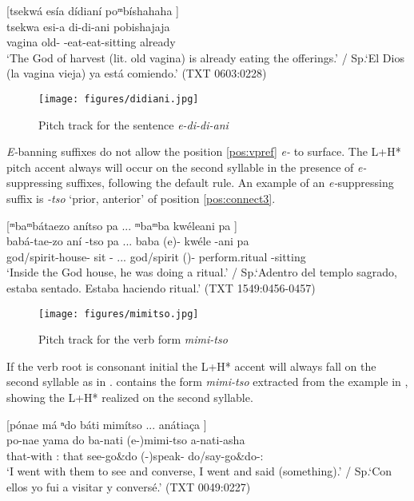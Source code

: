 \documentclass[output=paper,hidelinks]{langscibook}
\begin{document}
\ea \label{ex:didiani}
    [tsekwá esía dídianí poᵐbíshahaha \downarrow] \\
    \gll tsekwa esi-a di-di-ani pobishajaja  \\  
     vagina old-\Erg{} \E{}-eat-eat-sitting already   \\
    \glt `The God of harvest (lit. old vagina) is already eating the offerings.' / Sp.`El Dios (la vagina vieja) ya está comiendo.' \hfill (TXT 0603:0228)
\z 
\begin{figure}
    \texttt{[image: figures/didiani.jpg]}
    \caption{Pitch track for the sentence \textit{e-di-di-ani}}
    \label{fig:didiani}
\end{figure}

\textit{E-}banning suffixes do not allow the position \ref{pos:vpref} \textit{e-} to surface. The L+H* pitch accent always will occur on the second syllable in the presence of \textit{e-}suppressing suffixes, following the default rule. An example of an \textit{e-}suppressing suffix is \textit{-tso} `prior, anterior' of position \ref{pos:connect3}.

\newpage
\ea \label{ex:anitso}
    [ᵐbaᵐbátaezo anítso pa \downarrow ... ᵐbaᵐba kwéleani pa \downarrow] \\
    \gll babá-tae-zo aní -tso pa ... baba (e)- kwéle -ani pa \\  
    god/spirit-house-\Spat{} sit -\Prior{} \Rep{} ... god/spirit (\E{})- perform.ritual -sitting   \\
    \glt `Inside the God house, he was doing a ritual.' / Sp.`Adentro del templo sagrado, estaba sentado. Estaba haciendo ritual.' \hfill (TXT 1549:0456-0457)
\z 

\begin{figure}[b]
    \texttt{[image: figures/mimitso.jpg]}
    \caption{Pitch track for the verb form \textit{mimi-tso}}
    \label{fig:mimitso}
\end{figure}

If the verb root is consonant initial the L+H* accent will always fall on the second syllable as in .   contains the form \textit{mimi-tso} extracted from the example in , showing the L+H* realized on the second syllable.



\ea \label{ex:mimitso}
    [pónae má ⁿdo báti mimítso ... anátiaça \downarrow] \\
    \gll po-nae yama do ba-nati (e-)mimi-tso a-nati-asha \\  
     that-with \Fsg{}:\Erg{} that see-go\&do (\E{}-)speak-\Prior{} do/say-go\&do-\Dist{}:\Pst{}  \\
    \glt `I went with them to see and converse, I went and said (something).' / Sp.`Con ellos yo fui a visitar y conversé.' \hfill (TXT 0049:0227)
\z 
\end{document}
